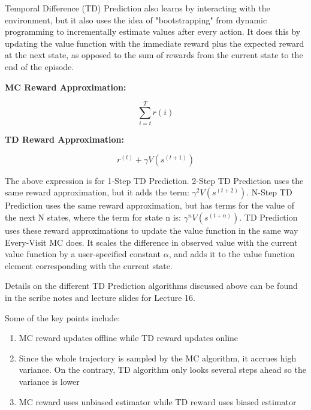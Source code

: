 \documentclass[11pt]{article}
\begin{document}
Temporal Difference (TD) Prediction also learns by interacting with the environment, but it also uses the idea of "bootstrapping" from dynamic programming to incrementally estimate values after every action. It does this by updating the value function with the immediate reward plus the expected reward at the next state, as opposed to the sum of rewards from the current state to the end of the episode. 

\textbf{MC Reward Approximation:} 

\begin{equation}
    \sum\limits_{i=t}^T r(i)\label{eq:MC_reward}
\end{equation}

\textbf{TD Reward Approximation:} 

\begin{equation}
    r^{(t)} + \gamma V(s^{(t+1)})\label{eq:TD_reward}
\end{equation}

The above expression is for 1-Step TD Prediction. 2-Step TD Prediction uses the same reward approximation, but it adds the term: $\gamma^2 V(s^{(t+2)})$. N-Step TD Prediction uses the same reward approximation, but has terms for the value of the next N states, where the term for state n is: $\gamma^n V(s^{(t+n)})$. TD Prediction uses these reward approximations to update the value function in the same way Every-Visit MC does. It scales the difference in observed value with the current value function by a user-specified constant $\alpha$, and adds it to the value function element corresponding with the current state. 

Details on the different TD Prediction algorithms discussed above can be found in the scribe notes and lecture slides for Lecture 16.

Some of the key points include:
\begin{enumerate}
  \item MC reward updates offline while TD reward updates online
  \item Since the whole trajectory is sampled by the MC algorithm, it accrues high variance. On the contrary, TD algorithm only looks several steps ahead so the variance is lower
  \item MC reward uses unbiased estimator while TD reward uses biased estimator
\end{enumerate}

\end{document}
